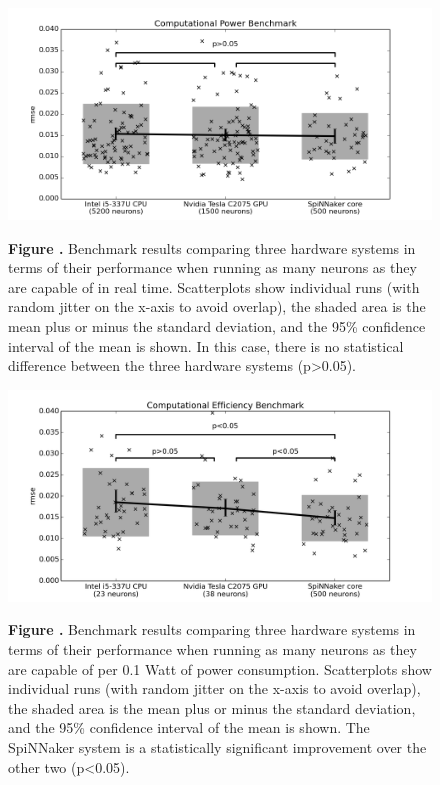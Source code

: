 \documentclass{frontiersSCNS} %
\begin{document}
\begin{figure}[h!]
\begin{center}
\includegraphics[width=18cm]{figures/plot_compute}
\end{center}
 \textbf{\label{fig:analysis_compute} Figure .}{ Benchmark results comparing three hardware systems
     in terms of their performance when running as many neurons as they are capable of in real time.  Scatterplots show individual runs (with random
     jitter on the x-axis to avoid overlap), the 
     shaded area is the mean plus or minus the standard deviation, and the 95\% confidence interval of the mean is shown.  In this case,
 there is no statistical difference between the three hardware systems (p>0.05).}
\end{figure}

\begin{figure}[h!]
\begin{center}
\includegraphics[width=18cm]{figures/plot_power}
\end{center}
 \textbf{\label{fig:analysis_power} Figure .}{ Benchmark results comparing three hardware systems
     in terms of their performance when running as many neurons as they are capable of per 0.1 Watt of power consumption.  Scatterplots show individual runs (with random jitter on the x-axis to avoid overlap), the 
     shaded area is the mean plus or minus the standard deviation, and the 95\% confidence interval of the mean is shown.  The SpiNNaker system is a statistically
 significant improvement over the other two (p<0.05).}
\end{figure}
\end{document}
